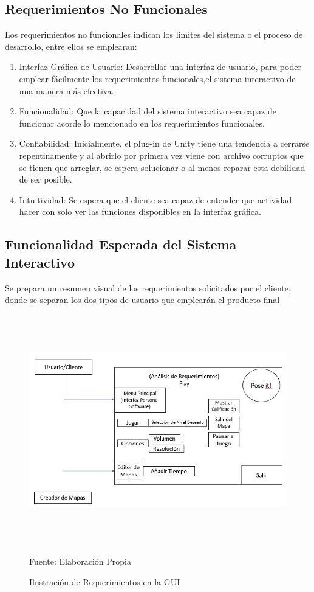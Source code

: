 \subsection{Requerimientos No Funcionales}

Los requerimientos no funcionales indican los limites del sistema o el proceso de desarrollo, entre ellos se emplearan:

\begin{enumerate}
	\item Interfaz Gráfica de Usuario: Desarrollar una interfaz de usuario, para poder emplear fácilmente los requerimientos funcionales,el sistema interactivo de una manera más efectiva.
	\item Funcionalidad: Que la capacidad del sistema interactivo sea capaz de funcionar acorde lo mencionado en los requerimientos funcionales.
	\item Confiabilidad: Inicialmente, el plug-in de Unity tiene una tendencia a cerrarse repentinamente y al abrirlo por primera vez viene con archivo corruptos que se tienen que arreglar, se espera solucionar o al menos reparar esta debilidad de ser posible.
	\item Intuitividad: Se espera que el cliente sea capaz de entender que actividad hacer con solo ver las funciones disponibles en la interfaz gráfica.
\end{enumerate}
\newpage
\subsection{Funcionalidad Esperada del Sistema Interactivo}

Se prepara un resumen visual de los requerimientos solicitados por el cliente, donde se separan los dos tipos de usuario que emplearán el producto final

\begin{figure}[h]
	\centering
	\includegraphics[width=16cm,height=10cm,]{./Images/requerimientosgraficaposeit.png}
	\caption{Ilustración de Requerimientos en la GUI}
	\footnotesize Fuente: Elaboración Propia
	\label{requerimientosgrafico}
\end{figure}

